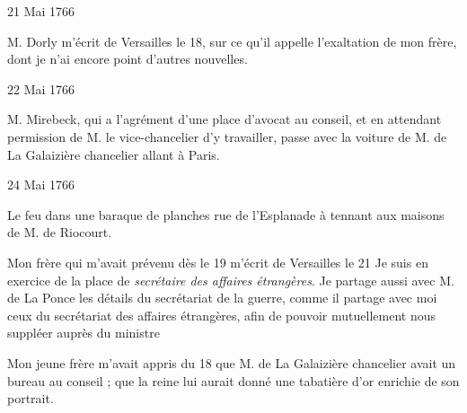                      \begin{diary}{21 Mai 1766}{}


                           M. Dorly m'écrit de Versailles
                           le 18, sur ce
                           qu'il appelle l'exaltation de mon
                              frère, dont
                           je n'ai encore point d'autres nouvelles. \bigskip


                     \end{diary}

                     \begin{diary}{22 Mai 1766}{}


                           M. Mirebeck, qui a l'agrément d'une
                           place
                           d'avocat au conseil, et en attendant
                           permission de M. le
                              vice-chancelier d'y
                           travailler, passe avec la voiture de M.
                              de La Galaizière chancelier allant à Paris.
                        \bigskip


                     \end{diary}

                     \begin{diary}{24 Mai 1766}{}

                         Le feu dans une baraque de planches
                           rue de
                              l'Esplanade à tennant aux maisons de
                           M. de Riocourt.
                        \bigskip



                           Mon frère qui m'avait
                           prévenu dès le 19
                           m'écrit de Versailles
                           le 21
                           \og Je suis en exercice
                              de la place de \emph{secrétaire des affaires
                                 étrangères}.
                              Je partage aussi avec M. de La
                                 Ponce les détails
                              du secrétariat de la guerre, comme il partage
                              avec moi ceux du secrétariat des affaires
                              étrangères, afin de pouvoir mutuellement
                              nous suppléer auprès du ministre \fg{}
                        \bigskip



                           Mon jeune frère m'avait appris du 18 que
                           M. de La Galaizière chancelier avait un bureau au conseil
                           ; que la reine lui
                           aurait donné
                           une tabatière d'or enrichie de son portrait. \bigskip


                     \end{diary}

